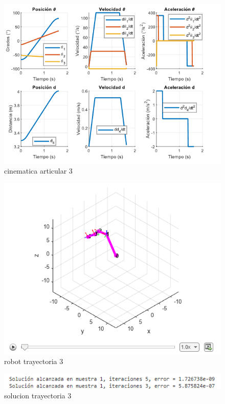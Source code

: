 \newpage

\begin{figure} [h]
	\centering
	\includegraphics[width=0.9\linewidth]{"../cinematica inversa/img/cinematica articular_trayectoria3"}
	\caption{cinematica articular 3}
	\label{fig:cinematica-articulartrayectoria3}
\end{figure}

\newpage

\begin{figure} [h]
	\centering
	\includegraphics[width=0.9\linewidth]{"../cinematica inversa/img/robot trayectoria 3"}
	\caption{robot trayectoria 3}
	\label{fig:robot-trayectoria-3}
\end{figure}

\newpage

\begin{figure} [h]
	\centering
	\includegraphics[width=0.9\linewidth]{"../cinematica inversa/img/solucion trayectoria 3"}
	\caption{solucion trayectoria 3}
	\label{fig:solucion-trayectoria-3}
\end{figure}

